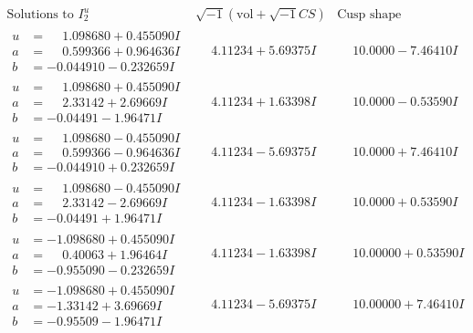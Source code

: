 \documentclass[1p]{elsarticle_modified}
\theoremstyle{definition}
\newcommand{\I}{\sqrt{-1}}
\begin{document}
$$\begin{array}{c|c|c}  
\text{Solutions to }I^u_{2}& \I (\text{vol} + \sqrt{-1}CS) & \text{Cusp shape}\\
 \hline 
\begin{aligned}
u &= \phantom{-}1.098680 + 0.455090 I \\
a &= \phantom{-}0.599366 + 0.964636 I \\
b &= -0.044910 - 0.232659 I\end{aligned}
 & \phantom{-}4.11234 + 5.69375 I & \phantom{-}10.0000 - 7.46410 I \\ \hline\begin{aligned}
u &= \phantom{-}1.098680 + 0.455090 I \\
a &= \phantom{-}2.33142 + 2.69669 I \\
b &= -0.04491 - 1.96471 I\end{aligned}
 & \phantom{-}4.11234 + 1.63398 I & \phantom{-}10.0000 - 0.53590 I \\ \hline\begin{aligned}
u &= \phantom{-}1.098680 - 0.455090 I \\
a &= \phantom{-}0.599366 - 0.964636 I \\
b &= -0.044910 + 0.232659 I\end{aligned}
 & \phantom{-}4.11234 - 5.69375 I & \phantom{-}10.0000 + 7.46410 I \\ \hline\begin{aligned}
u &= \phantom{-}1.098680 - 0.455090 I \\
a &= \phantom{-}2.33142 - 2.69669 I \\
b &= -0.04491 + 1.96471 I\end{aligned}
 & \phantom{-}4.11234 - 1.63398 I & \phantom{-}10.0000 + 0.53590 I \\ \hline\begin{aligned}
u &= -1.098680 + 0.455090 I \\
a &= \phantom{-}0.40063 + 1.96464 I \\
b &= -0.955090 - 0.232659 I\end{aligned}
 & \phantom{-}4.11234 - 1.63398 I & \phantom{-}10.00000 + 0.53590 I \\ \hline\begin{aligned}
u &= -1.098680 + 0.455090 I \\
a &= -1.33142 + 3.69669 I \\
b &= -0.95509 - 1.96471 I\end{aligned}
 & \phantom{-}4.11234 - 5.69375 I & \phantom{-}10.00000 + 7.46410 I \\ \hline\begin{aligned}

\end{aligned}
\end{array}$$
\end{document}
